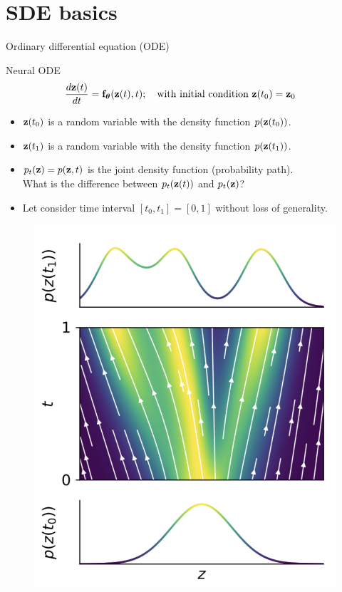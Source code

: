 \section{SDE basics}
\begin{frame}{Ordinary differential equation (ODE)}
	\vspace{-0.5cm}
	\begin{block}{Neural ODE}
		\vspace{-0.5cm}
		\begin{align*}
  \frac{d \mathbf{z}(t)}{dt} &= \mathbf{f}_{\boldsymbol{\theta}}(\mathbf{z}(t), t); \quad \text{with initial condition }\mathbf{z}(t_0) = \mathbf{z}_0
		\end{align*}
		\vspace{-0.8cm}
	\end{block}
	\begin{minipage}[t]{0.6\columnwidth}
		\begin{itemize}
			\item $\mathbf{z}(t_0)$ is a random variable with the density function $p(\mathbf{z}(t_0))$.
		 	\item $\mathbf{z}(t_1)$ is a random variable with the density function $p(\mathbf{z}(t_1))$.
			\item$p_t(\mathbf{z}) = p(\mathbf{z}, t)$ is the joint density function (probability path). \\ {\color{gray}What is the difference between $p_t(\mathbf{z}(t))$ and $p_t(\mathbf{z})$?}
			\item Let consider time interval $[t_0, t_1] = [0, 1]$ without loss of generality.
		\end{itemize}
	\end{minipage}%
	\begin{minipage}[t]{0.4\columnwidth}	
		\begin{figure}
			\centering
			\includegraphics[width=\linewidth]{figs/cnf_flow.png}

\end{figure}
\end{minipage}
\end{frame}
